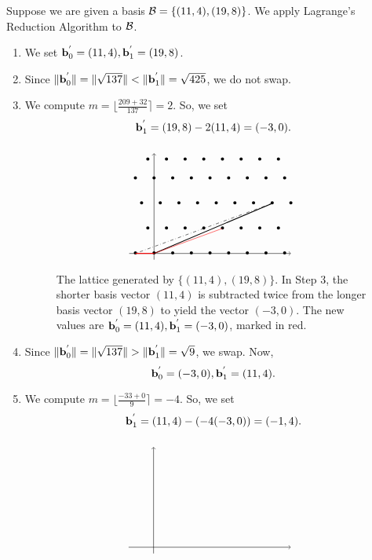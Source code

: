 \documentclass[a4paper,12pt]{article}
\begin{document}
\begin{ex}
Suppose we are given a basis $\B = \lbrace(11,4), (19,8)\rbrace$. We apply Lagrange's Reduction Algorithm to $\B$. 
\begin{enumerate}
    \item We set $\ba_0^{'} = (11,4), \ba_1^{'} = (19,8)$.
    \item Since $\|\ba_0^{'}\| = \|\sqrt{137}\| < \|\ba_1^{'}\| = \sqrt{425}$, we do not swap.
    \item We compute $m = \lfloor\frac{209+32}{137}\rceil = 2$. So, we set $$\ba_1^{'} = (19,8) - 2(11,4) = (-3,0).$$
        \begin{figure}[H]
            $$
            \begin{tikzpicture}[scale=0.2]
            \draw[->, thin] (-4,0)--(22,0) node [right] {}; 
            \draw[->, thin] (0,-1)--(0,16) node [above] {};
            \foreach \Point in {(-3,0), (0,0), (3,0), (6,0), (9,0), (12,0), (15,0), (18,0), (21,0), (-1,4), (2,4), (5,4), (8,4), (11,4), (14,4), (17,4), (20,4), (-2,8), (1,8), (4,8), (7,8), (10,8), (13,8), (16,8), (19,8), (22,8), (-3,12), (0,12), (3,12), (6,12), (9,12), (12,12), (15,12), (18,12), (21,12), (-1,15), (2,15), (5,15), (8,15), (11,15), (14,15), (17,15), (20,15)}{
                \node at \Point {\textbullet};    
            }
            \draw[thick] (0,0)--(19,8);
            \draw[red] (0,0)--(11,4);
            \draw[dash dot] (19,8)--(8,4);
            \draw[dash dot] (8,4)--(-3,0);
            \draw[thick, color=red] (0,0)--(-3,0);
            \end{tikzpicture}
            $$
            \caption{The lattice generated by $\lbrace(11,4), (19,8)\rbrace$. In Step 3, the shorter basis vector $(11,4)$ is subtracted twice from the longer basis vector $(19,8)$ to yield the vector $(-3,0)$. The new values are $\ba_0^{'} = (11,4), \ba_1^{'} = (-3,0)$, marked in red.}
        \end{figure}
    \item Since $\|\ba_0^{'}\| = \|\sqrt{137}\| > \|\ba_1^{'}\| = \sqrt{9}$, we swap. Now, $$\ba_0^{'} = (-3,0), \ba_1^{'} = (11,4).$$
    \item We compute $m = \lfloor\frac{-33+0}{9}\rceil = -4$. So, we set 
    $$\ba_1^{'} = (11,4) - (-4(-3,0)) = (-1,4).$$
        \begin{figure}[H]
            $$
            \begin{tikzpicture}[scale=0.2]
            \draw[->, thin] (-4,0)--(22,0) node [right] {}; 
            \draw[->, thin] (0,-1)--(0,16) node [above] {};

\end{tikzpicture}$$
\end{figure}
\end{enumerate}
\end{ex}
\end{document}
